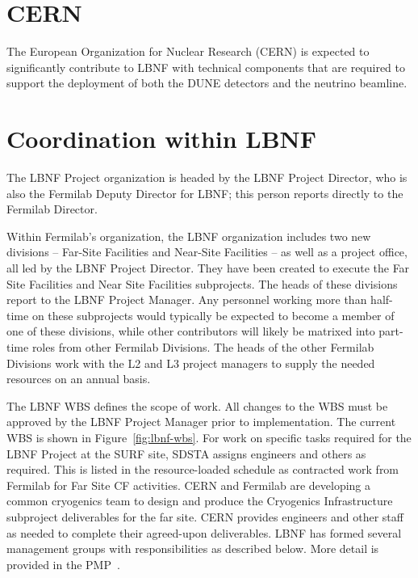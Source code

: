 \section{CERN}

The European Organization for Nuclear Research (CERN) is expected to significantly contribute to LBNF with technical components that are required to support the deployment of both the DUNE detectors and the neutrino beamline. 

\section{Coordination within LBNF}

The LBNF Project organization is headed by the LBNF Project Director, who is also the Fermilab Deputy Director for LBNF; this person reports directly to the Fermilab Director. 

Within Fermilab's organization, the LBNF organization includes two new divisions -- Far-Site Facilities and Near-Site Facilities -- as well as a project office, all led by the LBNF Project Director. They have been created to execute the Far Site Facilities and Near Site Facilities subprojects.
The heads of these divisions report to the LBNF Project Manager. 
Any personnel working more than half-time on these subprojects would typically be expected to become a member of one of these divisions, while other contributors will likely be matrixed into part-time roles from other Fermilab Divisions.  The heads of the other Fermilab Divisions work with the L2 and L3 project managers to supply the needed resources on an annual basis.    

The LBNF WBS defines the scope of work. All changes to the WBS must be approved by the LBNF Project Manager prior to implementation.   The current WBS is shown in Figure~\ref{fig:lbnf-wbs}. 
For work on specific tasks required for the LBNF Project at the SURF site, SDSTA assigns engineers and others as required. This is listed in the resource-loaded schedule as contracted work from Fermilab for Far Site CF activities. 
CERN and Fermilab are developing a common cryogenics team to design and produce the Cryogenics Infrastructure subproject deliverables for the far site. CERN provides engineers and other staff as needed to complete their agreed-upon deliverables.  
LBNF has formed several management groups with responsibilities as described below. More detail is provided in the PMP~\cite{lbnf-dune-pmp}.

